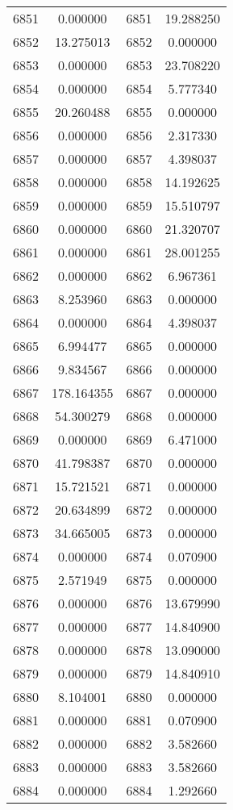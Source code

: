 \documentclass[12pt]{article}
\begin{document}
\begin{longtable}{@{}cccc@{}}
6851 & 0.000000 & 6851 & 19.288250 \\
6852 & 13.275013 & 6852 & 0.000000 \\
6853 & 0.000000 & 6853 & 23.708220 \\
6854 & 0.000000 & 6854 & 5.777340 \\
6855 & 20.260488 & 6855 & 0.000000 \\
6856 & 0.000000 & 6856 & 2.317330 \\
6857 & 0.000000 & 6857 & 4.398037 \\
6858 & 0.000000 & 6858 & 14.192625 \\
6859 & 0.000000 & 6859 & 15.510797 \\
6860 & 0.000000 & 6860 & 21.320707 \\
6861 & 0.000000 & 6861 & 28.001255 \\
6862 & 0.000000 & 6862 & 6.967361 \\
6863 & 8.253960 & 6863 & 0.000000 \\
6864 & 0.000000 & 6864 & 4.398037 \\
6865 & 6.994477 & 6865 & 0.000000 \\
6866 & 9.834567 & 6866 & 0.000000 \\
6867 & 178.164355 & 6867 & 0.000000 \\
6868 & 54.300279 & 6868 & 0.000000 \\
6869 & 0.000000 & 6869 & 6.471000 \\
6870 & 41.798387 & 6870 & 0.000000 \\
6871 & 15.721521 & 6871 & 0.000000 \\
6872 & 20.634899 & 6872 & 0.000000 \\
6873 & 34.665005 & 6873 & 0.000000 \\
6874 & 0.000000 & 6874 & 0.070900 \\
6875 & 2.571949 & 6875 & 0.000000 \\
6876 & 0.000000 & 6876 & 13.679990 \\
6877 & 0.000000 & 6877 & 14.840900 \\
6878 & 0.000000 & 6878 & 13.090000 \\
6879 & 0.000000 & 6879 & 14.840910 \\
6880 & 8.104001 & 6880 & 0.000000 \\
6881 & 0.000000 & 6881 & 0.070900 \\
6882 & 0.000000 & 6882 & 3.582660 \\
6883 & 0.000000 & 6883 & 3.582660 \\
6884 & 0.000000 & 6884 & 1.292660 \\

\end{longtable}
\end{document}
